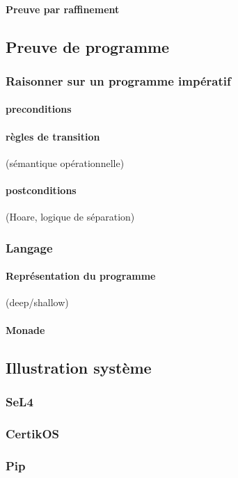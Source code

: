 				\paragraph{Preuve par raffinement}

		\subsection{Preuve de programme}

			\subsubsection{Raisonner sur un programme impératif}

				\paragraph{preconditions}

				\paragraph{règles de transition} (sémantique opérationnelle)

				\paragraph{postconditions} (Hoare, logique de séparation)

			\subsubsection{Langage}

				\paragraph{Représentation du programme} (deep/shallow)

				\paragraph{Monade}

		\subsection{Illustration système}

			\subsubsection{SeL4}
			\subsubsection{CertikOS}
			\subsubsection{Pip}
